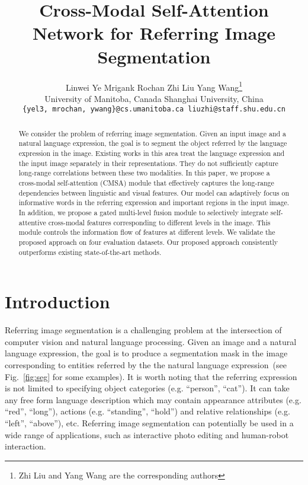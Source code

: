 \documentclass[10pt,twocolumn,letterpaper]{article}
\begin{document}
\title{Cross-Modal Self-Attention Network for Referring Image Segmentation}

\author{Linwei Ye \qquad Mrigank Rochan \qquad Zhi Liu \qquad Yang Wang\thanks{Zhi Liu and Yang Wang are the corresponding authors} \\
University of Manitoba, Canada \quad Shanghai University, China \\
{\tt\small \{yel3, mrochan, ywang\}@cs.umanitoba.ca  \qquad liuzhi@staff.shu.edu.cn}
}





\maketitle
\thispagestyle{empty}

\begin{abstract}

We consider the problem of referring image segmentation. Given an input image and a natural language expression, the goal is to segment the object referred by the language expression in the image. Existing works in this area treat the language expression and the input image separately in their representations. They do not sufficiently capture long-range correlations between these two modalities. In this paper, we propose a cross-modal self-attention (CMSA) module that effectively captures the long-range dependencies between linguistic and visual features. Our model can adaptively focus on informative words in the referring expression and important regions in the input image. In addition, we propose a gated multi-level fusion module to selectively integrate self-attentive cross-modal features corresponding to different levels in the image. This module controls the information flow of features at different levels. We validate the proposed approach on four evaluation datasets. Our proposed approach consistently outperforms existing state-of-the-art methods. 
 
\end{abstract}



\section{Introduction}
\label{sec:intro}
Referring image segmentation is a challenging problem at the intersection of computer vision and natural language processing. Given an image and a natural language expression, the goal is to produce a segmentation mask in the image corresponding to entities referred by the the natural language expression~(see Fig.~\ref{fig:seg} for some examples). It is worth noting that the referring expression is not limited to specifying object categories (e.g. ``person'', ``cat''). It can take any free form language description which may contain appearance attributes (e.g. ``red'', ``long''), actions (e.g. ``standing'', ``hold'') and relative relationships (e.g. ``left'', ``above''), etc. Referring image segmentation can potentially be used in a wide range of applications, such as interactive photo editing and human-robot interaction. 
\end{document}
